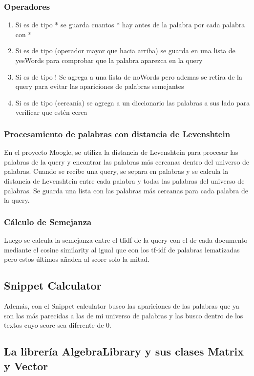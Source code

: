 \documentclass{article}
\begin{document}
\subsubsection{Operadores}
\begin{enumerate}
\item Si es de tipo * se guarda cuantos * hay antes de la palabra por cada palabra con *
\item Si es de tipo (operador mayor que hacia arriba) se guarda en una lista de yesWords para comprobar que la palabra aparezca en la query
\item Si es de tipo ! Se agrega a una lista de noWords pero ademas se retira de la query para evitar las apariciones de palabras semejantes
\item Si es de tipo (cercanía) se agrega a un diccionario las palabras a sus lado para verificar que estén cerca
\end{enumerate}

\subsubsection{Procesamiento de palabras con distancia de Levenshtein}

En el proyecto Moogle, se utiliza la distancia de Levenshtein para procesar las palabras de la query y encontrar las palabras más cercanas dentro del universo de palabras. Cuando se recibe una query, se separa en palabras y se calcula la distancia de Levenshtein entre cada palabra y todas las palabras del universo de palabras. Se guarda una lista con las palabras más cercanas para cada palabra de la query.

\subsubsection{Cálculo de Semejanza}
Luego se calcula la semejanza entre el tfidf de la query con el de cada documento mediante el cosine similarity al igual que con los tf-idf de palabras lematizadas pero estos últimos añaden al score solo la mitad.

\subsection{Snippet Calculator}
Además, con el Snippet calculator busco las apariciones de las palabras que ya son las más parecidas a las de mi universo de palabras y las busco dentro de los textos cuyo score sea diferente de 0.

\subsection{La librería AlgebraLibrary y sus clases Matrix y Vector}
\end{document}
